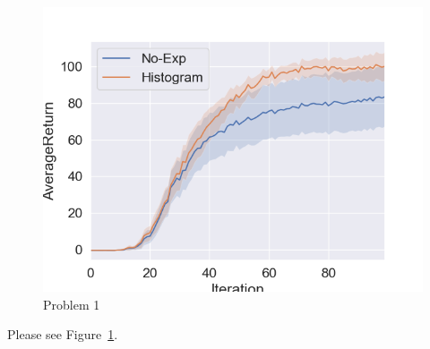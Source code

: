 \begin{figure}[htbp]
    \centering
    \includegraphics[width=0.5\linewidth]{figures/p1.png}
    \caption{Problem 1}
    \label{fig:p1}
\end{figure}

Please see Figure~\ref{fig:p1}. 